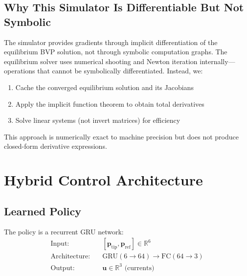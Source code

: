 \documentclass[conference]{IEEEtran}
\begin{document}
\subsection{Why This Simulator Is Differentiable But Not Symbolic}

The simulator provides gradients through implicit differentiation of the equilibrium BVP solution, not through symbolic computation graphs. The equilibrium solver uses numerical shooting and Newton iteration internally---operations that cannot be symbolically differentiated. Instead, we:
\begin{enumerate}
\item Cache the converged equilibrium solution and its Jacobians
\item Apply the implicit function theorem to obtain total derivatives
\item Solve linear systems (not invert matrices) for efficiency
\end{enumerate}

This approach is numerically exact to machine precision but does not produce closed-form derivative expressions.

\section{Hybrid Control Architecture}

\subsection{Learned Policy}

The policy is a recurrent GRU network:
\begin{align}
\text{Input}: & \quad [\mathbf{p}_{\text{tip}}, \mathbf{p}_{\text{ref}}] \in \mathbb{R}^6 \\
\text{Architecture}: & \quad \text{GRU}(6 \rightarrow 64) \rightarrow \text{FC}(64 \rightarrow 3) \\
\text{Output}: & \quad \mathbf{u} \in \mathbb{R}^3 \text{ (currents)}
\end{align}
\end{document}
